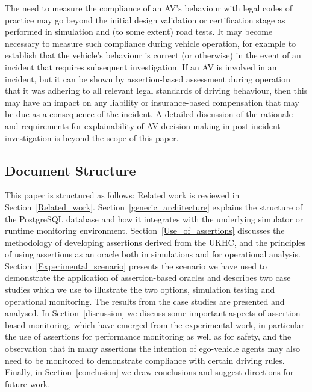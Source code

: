 The need to measure the compliance of an AV's behaviour with legal codes of practice may go beyond the initial design validation or certification stage as performed in simulation and (to some extent) road tests. It may become necessary to measure such compliance during vehicle operation, for example to establish that the vehicle's behaviour is correct (or otherwise) in the event of an incident that requires subsequent investigation. If an AV is involved in an incident, but it can be shown by assertion-based assessment during operation that it was adhering to all relevant legal standards of driving behaviour, then this may have an impact on any liability or insurance-based compensation that may be due as a consequence of the incident. A detailed discussion of the rationale and requirements for explainability of AV decision-making in post-incident investigation is beyond the scope of this paper.


\subsection{Document Structure}
This paper is structured as follows: 
%
Related work is reviewed in Section~\ref{Related_work}.
%
Section~\ref{generic_architecture} explains the structure of the PostgreSQL database and how it integrates with the underlying simulator or runtime monitoring environment. 
%
Section~\ref{Use_of_assertions} discusses the  methodology of developing assertions derived from the UKHC, and the principles of using  assertions as an oracle both in simulations and for operational analysis. 
%
Section~\ref{Experimental_scenario} presents the scenario we have used to demonstrate the application of assertion-based oracles and describes two case studies which we use to illustrate the two options, simulation testing and operational monitoring. The results from the case studies are presented and analysed. 
%
In Section~\ref{discussion} we discuss some important aspects of assertion-based monitoring, which have emerged from the experimental work, in particular the use of assertions for performance monitoring as well as for safety, and the observation that in many assertions the intention of ego-vehicle agents may also need to be monitored 
to demonstrate compliance with certain driving rules.
%
Finally, in Section~\ref{conclusion} we draw conclusions and suggest directions for future work.


